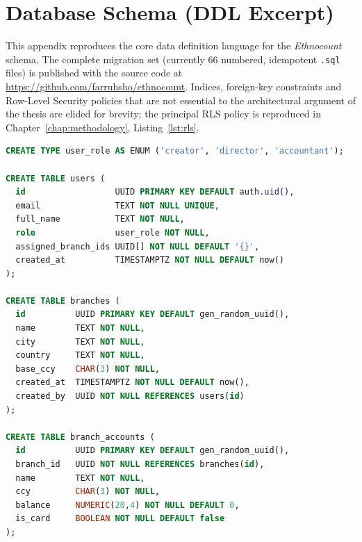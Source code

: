 \chapter{Database Schema (DDL Excerpt)}
\label{chap:appendixA}

This appendix reproduces the core data definition language for the \emph{Ethnocount} schema. The complete migration set (currently 66 numbered, idempotent \texttt{.sql} files) is published with the source code at \url{https://github.com/farruhsho/ethnocount}. Indices, foreign-key constraints and Row-Level Security policies that are not essential to the architectural argument of the thesis are elided for brevity; the principal RLS policy is reproduced in Chapter~\ref{chap:methodology}, Listing~\ref{lst:rls}.

\begin{lstlisting}[language=SQL,caption={Branches, users and branch accounts},label={lst:branches-ddl}]
CREATE TYPE user_role AS ENUM ('creator', 'director', 'accountant');

CREATE TABLE users (
  id                  UUID PRIMARY KEY DEFAULT auth.uid(),
  email               TEXT NOT NULL UNIQUE,
  full_name           TEXT NOT NULL,
  role                user_role NOT NULL,
  assigned_branch_ids UUID[] NOT NULL DEFAULT '{}',
  created_at          TIMESTAMPTZ NOT NULL DEFAULT now()
);

CREATE TABLE branches (
  id          UUID PRIMARY KEY DEFAULT gen_random_uuid(),
  name        TEXT NOT NULL,
  city        TEXT NOT NULL,
  country     TEXT NOT NULL,
  base_ccy    CHAR(3) NOT NULL,
  created_at  TIMESTAMPTZ NOT NULL DEFAULT now(),
  created_by  UUID NOT NULL REFERENCES users(id)
);

CREATE TABLE branch_accounts (
  id          UUID PRIMARY KEY DEFAULT gen_random_uuid(),
  branch_id   UUID NOT NULL REFERENCES branches(id),
  name        TEXT NOT NULL,
  ccy         CHAR(3) NOT NULL,
  balance     NUMERIC(20,4) NOT NULL DEFAULT 0,
  is_card     BOOLEAN NOT NULL DEFAULT false
);
\end{lstlisting}

